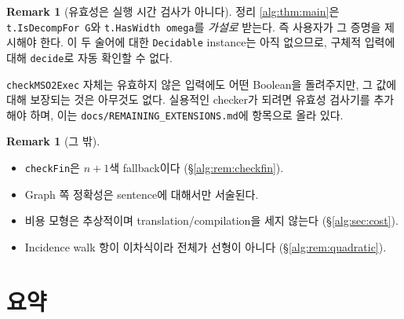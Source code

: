 \documentclass[11pt]{article}
\theoremstyle{definition}
\newtheorem{remark}[definition]{Remark}
\theoremstyle{plain}
\newcommand{\lean}[1]{\texttt{#1}}
\newcommand{\leanfile}[1]{\texttt{#1}}
\begin{document}
\begin{remark}[유효성은 실행 시간 검사가 아니다]
\label{alg:rem:validitynotchecked}
정리 \ref{alg:thm:main}은 \lean{t.IsDecompFor G}와 \lean{t.HasWidth omega}를
\emph{가설로} 받는다. 즉 사용자가 그 증명을 제시해야 한다. 이 두 술어에 대한
\lean{Decidable} instance는 아직 없으므로, 구체적 입력에 대해
\lean{decide}로 자동 확인할 수 없다.

\lean{checkMSO2Exec} 자체는 유효하지 않은 입력에도 어떤 Boolean을 돌려주지만,
그 값에 대해 보장되는 것은 아무것도 없다. 실용적인 checker가 되려면 유효성
검사기를 추가해야 하며, 이는
\leanfile{docs/REMAINING\_EXTENSIONS.md}에 항목으로 올라 있다.
\end{remark}

\begin{remark}[그 밖]
\begin{itemize}
  \item \lean{checkFin}은 $n+1$색 fallback이다 (\S\ref{alg:rem:checkfin}).
  \item Graph 쪽 정확성은 sentence에 대해서만 서술된다.
  \item 비용 모형은 추상적이며 translation/compilation을 세지 않는다
    (\S\ref{alg:sec:cost}).
  \item Incidence walk 항이 이차식이라 전체가 선형이 아니다
    (\S\ref{alg:rem:quadratic}).
\end{itemize}
\end{remark}

\section{요약}
\label{alg:sec:summary}
\end{document}
